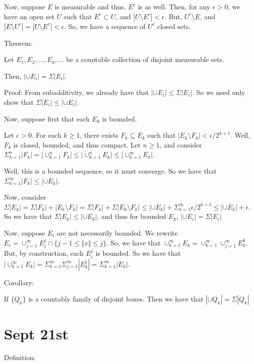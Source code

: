 \documentclass[10pt]{article}
\begin{document}
Now, suppose $E$ is measurable and thus, $E^c$ is as well. Then, for any $\epsilon > 0$, we have an open set $U$ such that $E^c \subset U$, and $|U \setminus E^c| < \epsilon$. But, $U^c \setminus E$, and $|E \setminus U^c| = |U \setminus E^c| < \epsilon$. So, we have a sequence of $U^c$ closed sets.

Theorem:

Let $E_1,E_2,...,E_k,...$ be a countable collection of disjoint measurable sets.

Then, $|\cup E_i| = \Sigma |E_i|$.

Proof: From subadditivity, we already have that $|\cup E_i| \leq \Sigma |E_i|$. So we need only show that $\Sigma|E_i| \leq |\cup E_i|$.

Now, suppose first that each $E_k$ is bounded. 

Let $\epsilon > 0$. For each $k \geq 1$, there exists $F_k \subseteq E_k$ such that $|E_k \setminus F_k| < \epsilon/2^{k+1}$. Well, $F_k$ is closed, bounded, and thus compact. Let $n \geq 1$, and consider $\Sigma_{k=1}^n |F_k| = | \cup_{k=1}^n F_k | \leq | \cup_{k=1}^n E_k |  \leq | \cup_{k=1}^\infty E_k |$.

Well, this is a bounded sequence, so it must converge. So we have that $\Sigma_{k=1}^\infty |F_k| \leq | \cup E_k|$.

Now, consider $\Sigma |E_k| = \Sigma | F_k | + | E_k \setminus F_k| = \Sigma | F_k | +  \Sigma | E_k \setminus F_k| \leq | \cup E_k| + \Sigma_{k=1}^\infty \epsilon/2^{k+1} \leq | \cup E_k| + \epsilon$. So we have that $\Sigma |E_k| \leq | \cup E_k |$, and thus for bounded $E_k$,  $|\cup E_i| = \Sigma |E_i|$

Now, suppose $E_i$ are not necessarily bounded. We rewrite $E_i = \cup_{j=1}^\infty E_i^j \cap \{ j-1 \leq \Vert x \Vert \leq j \}$. So, we have that $ \cup_{k=1}^\infty E_k = \cup_{k=1}^\infty \cup_{j=1}^\infty E_k^k$. But, by construction, each $E_i^j$ is bounded. So we have that $| \cup_{k=1}^\infty E_k| = \Sigma_{k=1}^\infty \Sigma_{j=1}^\infty |E_k^j| =   \Sigma_{k=1}^\infty |E_k|$.

Corollary:

If $\{ Q_k \}$ is a countably family of disjoint boxes. Then we have that $|\cup Q_k| = \Sigma |Q_k|$

\section*{Sept 21st}

Definition:
\end{document}
